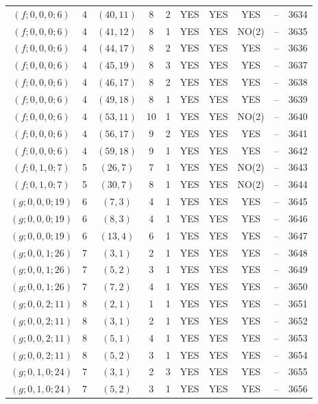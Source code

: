 \begin{longtable}{|c|c|c|c|c|c|c|c|c|c|}
$(f; 0, 0, 0; 6)$ & 4 & $(40, 11)$ & 8 & 2 & YES & YES & YES & -- & 3634\\
$(f; 0, 0, 0; 6)$ & 4 & $(41, 12)$ & 8 & 1 & YES & YES & NO(2) & -- & 3635\\
$(f; 0, 0, 0; 6)$ & 4 & $(44, 17)$ & 8 & 2 & YES & YES & YES & -- & 3636\\
$(f; 0, 0, 0; 6)$ & 4 & $(45, 19)$ & 8 & 3 & YES & YES & YES & -- & 3637\\
$(f; 0, 0, 0; 6)$ & 4 & $(46, 17)$ & 8 & 2 & YES & YES & YES & -- & 3638\\
$(f; 0, 0, 0; 6)$ & 4 & $(49, 18)$ & 8 & 1 & YES & YES & YES & -- & 3639\\
$(f; 0, 0, 0; 6)$ & 4 & $(53, 11)$ & 10 & 1 & YES & YES & NO(2) & -- & 3640\\
$(f; 0, 0, 0; 6)$ & 4 & $(56, 17)$ & 9 & 2 & YES & YES & YES & -- & 3641\\
$(f; 0, 0, 0; 6)$ & 4 & $(59, 18)$ & 9 & 1 & YES & YES & YES & -- & 3642\\
$(f; 0, 1, 0; 7)$ & 5 & $(26, 7)$ & 7 & 1 & YES & YES & NO(2) & -- & 3643\\
$(f; 0, 1, 0; 7)$ & 5 & $(30, 7)$ & 8 & 1 & YES & YES & NO(2) & -- & 3644\\
$(g; 0, 0, 0; 19)$ & 6 & $(7, 3)$ & 4 & 1 & YES & YES & YES & -- & 3645\\
$(g; 0, 0, 0; 19)$ & 6 & $(8, 3)$ & 4 & 1 & YES & YES & YES & -- & 3646\\
$(g; 0, 0, 0; 19)$ & 6 & $(13, 4)$ & 6 & 1 & YES & YES & YES & -- & 3647\\
$(g; 0, 0, 1; 26)$ & 7 & $(3, 1)$ & 2 & 1 & YES & YES & YES & -- & 3648\\
$(g; 0, 0, 1; 26)$ & 7 & $(5, 2)$ & 3 & 1 & YES & YES & YES & -- & 3649\\
$(g; 0, 0, 1; 26)$ & 7 & $(7, 2)$ & 4 & 1 & YES & YES & YES & -- & 3650\\
$(g; 0, 0, 2; 11)$ & 8 & $(2, 1)$ & 1 & 1 & YES & YES & YES & -- & 3651\\
$(g; 0, 0, 2; 11)$ & 8 & $(3, 1)$ & 2 & 1 & YES & YES & YES & -- & 3652\\
$(g; 0, 0, 2; 11)$ & 8 & $(5, 1)$ & 4 & 1 & YES & YES & YES & -- & 3653\\
$(g; 0, 0, 2; 11)$ & 8 & $(5, 2)$ & 3 & 1 & YES & YES & YES & -- & 3654\\
$(g; 0, 1, 0; 24)$ & 7 & $(3, 1)$ & 2 & 3 & YES & YES & YES & -- & 3655\\
$(g; 0, 1, 0; 24)$ & 7 & $(5, 2)$ & 3 & 1 & YES & YES & YES & -- & 3656\\

\end{longtable}

